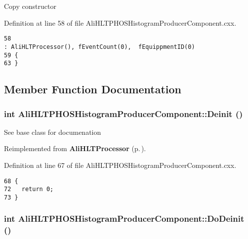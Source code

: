 Copy constructor 

Definition at line 58 of file Ali\-HLTPHOSHistogram\-Producer\-Component.cxx.

\footnotesize\begin{verbatim}58                                                                                                                          : AliHLTProcessor(), fEventCount(0),  fEquippmentID(0)
59 {
63 }
\end{verbatim}\normalsize 




\subsection{Member Function Documentation}
\subsubsection{\setlength{\rightskip}{0pt plus 5cm}int Ali\-HLTPHOSHistogram\-Producer\-Component::Deinit ()\hspace{0.3cm}{\tt  [virtual]}}\label{classAliHLTPHOSHistogramProducerComponent_a5}


See base class for documenation 

Reimplemented from {\bf Ali\-HLTProcessor} {\rm (p.\,\pageref{classAliHLTProcessor_a3})}.

Definition at line 67 of file Ali\-HLTPHOSHistogram\-Producer\-Component.cxx.

\footnotesize\begin{verbatim}68 {
72   return 0;
73 }
\end{verbatim}\normalsize 


\subsubsection{\setlength{\rightskip}{0pt plus 5cm}int Ali\-HLTPHOSHistogram\-Producer\-Component::Do\-Deinit ()\hspace{0.3cm}{\tt  [virtual]}}\label{classAliHLTPHOSHistogramProducerComponent_a6}


